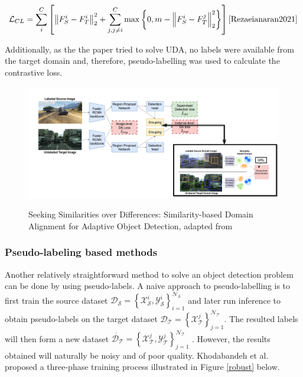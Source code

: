 \documentclass[english, 12pt, a4paper, elec, utf8, a-1b, online]{aaltothesis}
\begin{document}
\begin{equation}
\mathcal{L}_{C L}=\sum_{i}^{C}\left[\left\|F_{S}^{i}-F_{T}^{i}\right\|_{2}^{2}+\sum_{j, j \neq i}^{C} \max \left\{0, m-\left\|F_{S}^{i}-F_{T}^{j}\right\|_{2}^{2}\right\}\right]
\label{contrastiveL} 
\cite{Rezaeianaran2021} 
\end{equation}

Additionally, as the the paper tried to solve UDA, no labels were available from the target domain and, therefore, pseudo-labelling was used to calculate the contrastive loss.  


\begin{figure}[htb]
	\begin{center}
		\includegraphics[width=16cm]{./VisGa.png}
	\end{center}
	\caption{Seeking Similarities over Differences: Similarity-based Domain Alignment for Adaptive Object Detection, adapted from \cite{Rezaeianaran2021}}
	\begin{center}
		\label{visga}
	\end{center}
\end{figure}
\FloatBarrier


\subsubsection{Pseudo-labeling based methods}

Another relatively straightforward method to solve an object detection problem can be done by using pseudo-labels. A naive approach to pseudo-labelling is to first train the source dataset $\mathcal{D}_{\mathcal{S}}=\left\{\mathcal{X}_{\mathcal{S}}^{i}, \mathcal{Y}_{\mathcal{S}}^{i}\right\}_{i=1}^{\mathcal{N}_{\mathcal{S}}}$ and later run inference to obtain pseudo-labels on the target dataset $\mathcal{D}_{\mathcal{T}}=\left\{\mathcal{X}_{\mathcal{T}}^{j}\right\}_{j=1}^{\mathcal{N}_{\mathcal{T}}}$. The resulted labels will then form a new dataset $\dot{\mathcal{D}_{\mathcal{T}}}=\left\{\mathcal{X}_{\mathcal{T}}^{j}, \mathcal{Y}_{\mathcal{T}}^{j}\right\}_{j=1}^{\mathcal{N}_{\mathcal{T}}}$ \cite{Oza2021}. However, the results obtained will naturally be noisy and of poor quality. Khodabandeh et al. proposed a three-phase training process illustrated in Figure \ref{robust} below. 
\end{document}
